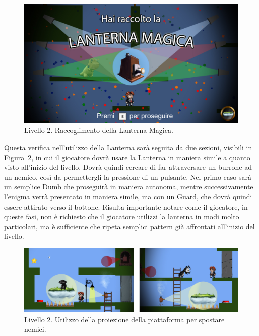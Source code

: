\begin{figure}%
	\centering
	\includegraphics[width= 0.9\columnwidth]{images/gameDesign/48_lanterna.jpg}
	\caption{Livello 2. Raccoglimento della Lanterna Magica.}
	\label{fig:livello2_lanterna}
\end{figure}

Questa verifica nell’utilizzo della Lanterna sarà seguita da due sezioni, visibili in Figura~\ref{fig:livello2_nemici_pulsanti}, in cui il giocatore dovrà usare la Lanterna in maniera simile a quanto visto all’inizio del livello. Dovrà quindi cercare di far attraversare un burrone ad un nemico, così da permettergli la pressione di un pulsante. Nel primo caso sarà un semplice Dumb che proseguirà in maniera autonoma, mentre successivamente l’enigma verrà presentato in maniera simile, ma con un Guard, che dovrà quindi essere attirato verso il bottone. Risulta importante notare come il giocatore, in queste fasi, non è richiesto che il giocatore utilizzi la lanterna in modi molto particolari, ma è sufficiente che ripeta semplici pattern già affrontati all’inizio del livello.

\begin{figure}%
	\centering
	\includegraphics[width= 0.98\columnwidth]{images/gameDesign/49_piattaforma_nemici.jpg}
	\caption{Livello 2. Utilizzo della proiezione della piattaforma per spostare nemici.}
	\label{fig:livello2_nemici_pulsanti}
\end{figure}

